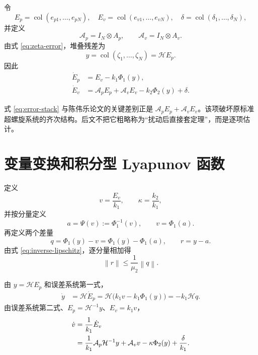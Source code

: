 \documentclass[UTF8,a4paper,12pt]{ctexart}
\DeclareMathOperator{\col}{col}
\newcommand{\norm}[1]{\left\lVert #1\right\rVert}
\newcommand{\cH}{\mathcal H}
\newcommand{\Ap}{\mathcal A_p}
\newcommand{\Av}{\mathcal A_v}
\begin{document}
令
\begin{equation}
 E_p=\col(e_{p1},\ldots,e_{pN}),\quad
 E_v=\col(e_{v1},\ldots,e_{vN}),\quad
 \delta=\col(\delta_1,\ldots,\delta_N),
\end{equation}
并定义
\begin{equation}
 \Ap=I_N\otimes A_p,\qquad \Av=I_N\otimes A_v.
\end{equation}
由式 \eqref{eq:zeta-error}，堆叠残差为
\begin{equation}
 y=\col(\zeta_1,\ldots,\zeta_N)=\cH E_p.
\label{eq:y-stack}
\end{equation}
因此
\begin{equation}
\begin{aligned}
 \dot E_p&=E_v-k_1\Phi_1(y),\\
 \dot E_v&=\Ap E_p+\Av E_v-k_2\Phi_2(y)+\delta.
\end{aligned}
\label{eq:error-stack}
\end{equation}

\begin{cwbox}
式 \eqref{eq:error-stack} 与陈伟乐论文的关键差别正是 $\Ap E_p+\Av E_v$。该项破坏原标准超螺旋系统的齐次结构。后文不把它粗略称为“扰动后直接套定理”，而是逐项估计。
\end{cwbox}

\section{变量变换和积分型 Lyapunov 函数}

定义
\begin{equation}
 v=\frac{E_v}{k_1},\qquad \kappa=\frac{k_2}{k_1},
\label{eq:v-kappa}
\end{equation}
并按分量定义
\begin{equation}
 a=\Psi(v):=\Phi_1^{-1}(v),\qquad v=\Phi_1(a).
\label{eq:a-def}
\end{equation}
再定义两个差量
\begin{equation}
 q=\Phi_1(y)-v=\Phi_1(y)-\Phi_1(a),\qquad r=y-a.
\label{eq:q-r}
\end{equation}
由式 \eqref{eq:inverse-lipschitz}，逐分量相加得
\begin{equation}
 \norm r\le\frac{1}{\mu_2}\norm q.
\label{eq:r-q-bound}
\end{equation}

由 $y=\cH E_p$ 和误差系统第一式，
\begin{align}
 \dot y
 &=\cH\dot E_p
 =\cH\big(k_1v-k_1\Phi_1(y)\big)
 =-k_1\cH q.
\label{eq:y-dot}
\end{align}
由误差系统第二式、$E_p=\cH^{-1}y$、$E_v=k_1v$，
\begin{align}
 \dot v
 &=\frac{1}{k_1}\dot E_v\notag\\
 &=\frac{1}{k_1}\Ap\cH^{-1}y+\Av v
 -\kappa\Phi_2(y)+\frac{\delta}{k_1}.
\label{eq:v-dot}
\end{align}
\end{document}
